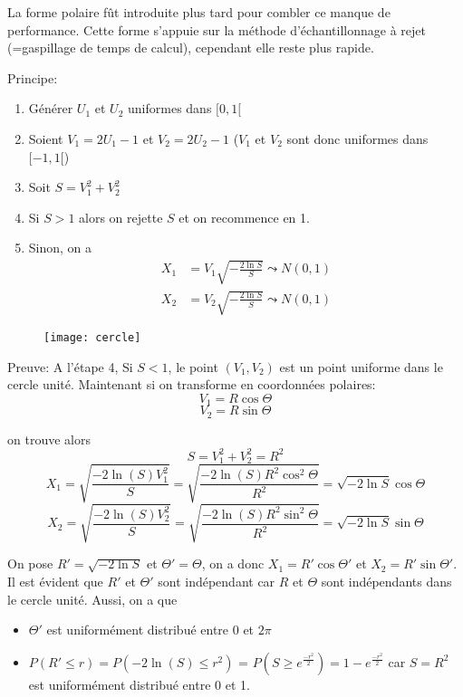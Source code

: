 La forme polaire fût introduite plus tard pour combler ce manque de performance.
Cette forme s'appuie sur la méthode d'échantillonnage à rejet (=gaspillage de temps de calcul), cependant elle reste plus rapide.

Principe:
\begin{enumerate}
	\item Générer $U_1$ et $U_2$ uniformes dans $[0,1[$
	\item Soient $V_1=2U_1-1$ et $V_2=2U_2-1$ ($V_1$ et $V_2$ sont donc uniformes dans $[-1,1[$)
	\item Soit $S=V_1^2+V_2^2$
	\item Si $S>1$ alors on rejette $S$ et on recommence en 1.
	\item Sinon, on a
		\[
		\begin{split}
		X_1&=V_1\sqrt{-\frac{2\ln{S}}{S}} \leadsto N(0,1)\\
		X_2&=V_2\sqrt{-\frac{2\ln{S}}{S}} \leadsto N(0,1)
		\end{split}
		\]
\end{enumerate}
\vspace{0.3cm}
\begin{figure}[h]
   \texttt{[image: cercle]}
	\centering
\end{figure}

Preuve:
A l'étape 4, Si $S<1$, le point $(V_1, V_2)$ est un point uniforme dans le cercle unité. Maintenant si on transforme en coordonnées polaires:
\[V_1 = R \cos{\Theta}\]
\[V_2 = R \sin{\Theta}\]

on trouve alors \[S = V_1^2+V_2^2 = R^2\]
\[X_1 = \sqrt{\frac{-2\ln{(S)}V_1^2}{S}} = \sqrt{\frac{-2\ln{(S)R^2\cos^2{\Theta}}}{R^2}} = \sqrt{-2\ln{S}}\cos{\Theta}\]
\[X_2 = \sqrt{\frac{-2\ln{(S)}V_2^2}{S}} = \sqrt{\frac{-2\ln{(S)R^2\sin^2{\Theta}}}{R^2}} = \sqrt{-2\ln{S}}\sin{\Theta}\]
\vspace{0.3cm}

On pose $R'=\sqrt{-2\ln{S}}$ et $\Theta' = \Theta$, on a donc $X_1=R'\cos{\Theta'}$ et $X_2=R'\sin{\Theta'}$. Il est évident que $R'$ et
$\Theta'$ sont indépendant car $R$ et $\Theta$ sont indépendants dans le cercle unité. Aussi, on a que 
\begin{itemize}
 \item $\Theta'$ est uniformément distribué entre 0 et $2\pi$
 \item $P(R'\leq r) = P(-2\ln(S)\leq r^2)$ = $P(S\geq e^{\frac{-r^2}{2}}) = 1-e^{\frac{-r^2}{2}}$ car $S=R^2$ est uniformément distribué entre
 0 et 1.
\end{itemize}

